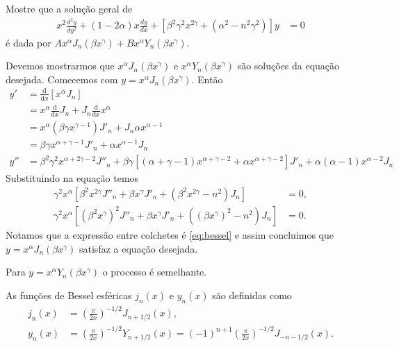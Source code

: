 \documentclass[a4paper,12pt, leqno, answers]{exam}
\begin{document}
\begin{questions}
     Mostre que a solu\c{c}\~{a}o geral de
    \begin{align*}
        x^2 \frac{d^2y}{dy^2} + (1 - 2\alpha)x\frac{dy}{dx} + \left[ \beta^2 \gamma^2 x^{2\gamma} + (\alpha^2 - n^2 \gamma^2) \right]y &= 0
    \end{align*}
    \'{e} dada por $A x^\alpha J_n(\beta x^\gamma) + B x^\alpha Y_n(\beta x^\gamma)$.
    \begin{solution}
        Devemos mostrarmos que $x^\alpha J_n(\beta x^\gamma)$ e $x^\alpha Y_n(\beta x^\gamma)$ s\~{a}o solu\c{c}\~{o}es da equa\c{c}\~{a}o desejada. Comecemos com $y = x^\alpha J_n(\beta x^\gamma)$. Ent\~{a}o
        \begin{align*}
            y' &= \frac{\mathrm{d}}{\mathrm{d}x} \left[ x^\alpha J_n \right] \\
            &= x^\alpha \frac{\mathrm{d}}{\mathrm{d}x} J_n + J_n \frac{\mathrm{d}}{\mathrm{d}x} x^\alpha \\
            &= x^\alpha (\beta \gamma x^{\gamma - 1}) J'_n + J_n \alpha x^{\alpha - 1} \\
            &= \beta \gamma x^{\alpha + \gamma - 1} J'_n + \alpha x^{\alpha - 1} J_n \\
            y'' &= \beta^2 \gamma^2 x^{\alpha + 2 \gamma - 2} J''_n + \beta \gamma \left[ (\alpha + \gamma - 1) x^{\alpha + \gamma - 2} + \alpha x^{\alpha + \gamma - 2} \right] J'_n + \alpha (\alpha - 1) x^{\alpha - 2} J_n
        \end{align*}
        Substituindo na equa\c{c}\~{a}o temos
        \begin{align*}
            \gamma^2 x^\alpha \left[ \beta^2 x^{2 \gamma} J''_n + \beta x^\gamma J'_n + (\beta^2 x^{2\gamma} - n^2) J_n \right] &= 0,\\
            \gamma^2 x^\alpha \left[ (\beta^2 x^\gamma)^2 J''_n + \beta x^\gamma J'_n + ( (\beta x^\gamma)^2 - n^2) J_n \right] &= 0.
        \end{align*}
        Notamos que a express\~{a}o entre colchetes \'{e} \eqref{eq:bessel} e assim concluimos que $y = x^\alpha J_n(\beta x^\gamma)$ satisfaz a equa\c{c}\~{a}o desejada.

        Para $y = x^\alpha Y_n(\beta x^\gamma)$ o processo \'{e} semelhante.
    \end{solution}

    As fun\c{c}\~{o}es de Bessel esf\'{e}ricas $j_n(x)$ e $y_n(x)$ s\~{a}o definidas como
    \begin{align}
        j_{n}(x) &= \left( \frac{\pi}{2x} \right)^{-1/2} J_{n + 1/2}(x), \label{eq:bessel_esf_prim} \\
        y_n(x) &= \left( \frac{\pi}{2x} \right)^{-1/2} Y_{n + 1/2}(x) = (-1)^{n + 1} \left( \frac{\pi}{2x} \right)^{-1/2} J_{-n - 1/2}(x). \label{eq:bessel_esf_seg}
    \end{align}


\end{questions}
\end{document}

